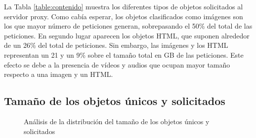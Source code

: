 \documentclass[twocolumn]{Jornadas}
\begin{document}
La Tabla \ref{table:contenido} muestra los diferentes tipos de objetos solicitados al servidor proxy. Como cabía esperar, los objetos clasificados como imágenes son los que mayor número de peticiones generan, sobrepasando el 50\% del total de las peticiones. En segundo lugar aparecen los objetos HTML, que suponen alrededor de un 26\% del total de peticiones. Sin embargo, las imágenes y los HTML representan un 21 y un 9\% sobre el tamaño total en GB de las peticiones. Este efecto se debe a la presencia de vídeos y audios que ocupan mayor tamaño respecto a una imagen y un HTML.   

\subsection{Tamaño de los objetos únicos y solicitados}
\label{unicos_solicitados}

\begin{figure}[ht!]
\centering
{}
\caption{Análisis de la distribución del tamaño de los objetos únicos y solicitados}
\label{fig:tamObjetos}
\end{figure}
\end{document}
